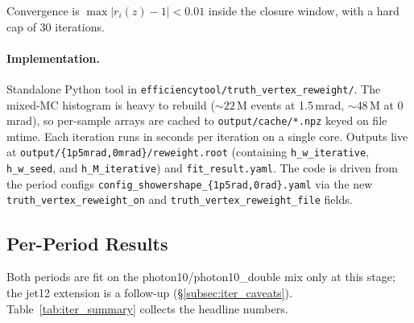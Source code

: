 \documentclass[11pt,a4paper]{article}
\begin{document}
Convergence is $\max|r_i(z)-1|<0.01$ inside the closure window, with
a hard cap of 30 iterations.

\paragraph{Implementation.}
Standalone Python tool in
\texttt{efficiencytool/truth\_vertex\_reweight/}. The mixed-MC
histogram is heavy to rebuild ($\sim\!22$\,M events at 1.5\,mrad,
$\sim\!48$\,M at 0\,mrad), so per-sample arrays are cached to
\texttt{output/cache/*.npz} keyed on file mtime. Each iteration
runs in seconds per iteration on a single core. Outputs live at
\texttt{output/\{1p5mrad,0mrad\}/reweight.root} (containing
\texttt{h\_w\_iterative}, \texttt{h\_w\_seed}, and
\texttt{h\_M\_iterative}) and \texttt{fit\_result.yaml}. The code
is driven from the period configs \texttt{config\_showershape\_\{1p5rad,0rad\}.yaml}
via the new \texttt{truth\_vertex\_reweight\_on} and
\texttt{truth\_vertex\_reweight\_file} fields.

\subsection{Per-Period Results}
\label{subsec:iter_results}

Both periods are fit on the photon10/photon10\_double mix only at
this stage; the jet12 extension is a follow-up
(\S\ref{subsec:iter_caveats}). Table~\ref{tab:iter_summary}
collects the headline numbers.
\end{document}
